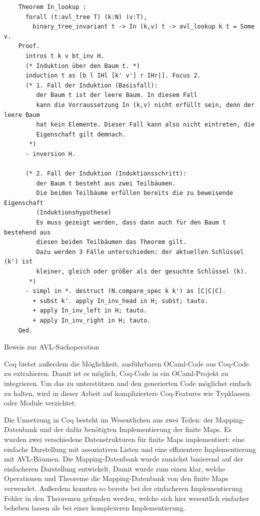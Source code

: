 \documentclass[a4paper, parskip]{scrartcl}
\begin{document}
\begin{listing}
  \begin{verbatim}
    Theorem In_lookup :
      forall (t:avl_tree T) (k:N) (v:T),
        binary_tree_invariant t -> In (k,v) t -> avl_lookup k t = Some v.
    Proof.
      intros t k v bt_inv H. 
      (* Induktion über den Baum t. *)
      induction t as [b l IHl [k' v'] r IHr|]. Focus 2.
      (* 1. Fall der Induktion (Basisfall):
         der Baum t ist der leere Baum. In diesem Fall 
         kann die Vorraussetzung In (k,v) nicht erfüllt sein, denn der leere Baum
         hat kein Elemente. Dieser Fall kann also nicht eintreten, die 
         Eigenschaft gilt demnach.
       *)
      - inversion H.      

      (* 2. Fall der Induktion (Induktionsschritt): 
         der Baum t besteht aus zwei Teilbäumen. 
         Die beiden Teilbäume erfüllen bereits die zu beweisende Eigenschaft 
         (Induktionshypothese)
         Es muss gezeigt werden, dass dann auch für den Baum t bestehend aus 
         diesen beiden Teilbäumen das Theorem gilt.
         Dazu werden 3 Fälle unterschieden: der aktuellen Schlüssel (k') ist 
         kleiner, gleich oder größer als der gesuchte Schlüssel (k).
       *)
      - simpl in *. destruct (N.compare_spec k k') as [C|C|C].
        + subst k'. apply In_inv_head in H; subst; tauto.
        + apply In_inv_left in H; tauto.
        + apply In_inv_right in H; tauto.
    Qed.
  \end{verbatim}
  \caption{Beweis zur AVL-Suchoperation}
  \label{lst:avl-lookup-proof}
\end{listing}

Coq bietet außerdem die Möglichkeit, ausführbaren OCaml-Code aus Coq-Code zu extrahieren.\autocite{extract-overview}
Damit ist es möglich, Coq-Code in ein OCaml-Projekt zu integrieren.
Um das zu unterstützen und den generierten Code möglichst einfach zu halten, wird in dieser Arbeit auf kompliziertere Coq-Features wie Typklassen oder Module verzichtet.

Die Umsetzung in Coq besteht im Wesentlichen aus zwei Teilen: der Mapping-Datenbank und der dafür benötigten Implementierung der finite Maps.
Es wurden zwei verschiedene Datenstrukturen für finite Maps implementiert: eine einfache Darstellung mit assoziativen Listen und eine effizientere Implementierung mit AVL-Bäumen.
Die Mapping-Datenbank wurde zunächst basierend auf der einfacheren Darstellung entwickelt.
Damit wurde zum einen klar, welche Operationen und Theoreme die Mapping-Datenbank von den finite Maps verwendet.
Außerdem konnten so bereits bei der einfacheren Implementierung Fehler in den Theoremen gefunden werden, welche sich hier wesentlich einfacher beheben lassen als bei einer komplexeren Implementierung.
\end{document}

